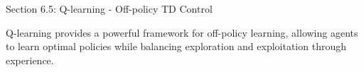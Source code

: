 \begin{notes}{Section 6.5: Q-learning - Off-policy TD Control}
\begin{highlight}
        Q-learning provides a powerful framework for off-policy learning, allowing agents to learn optimal policies while balancing exploration and exploitation through experience.
    
    \end{highlight}
\end{notes}
